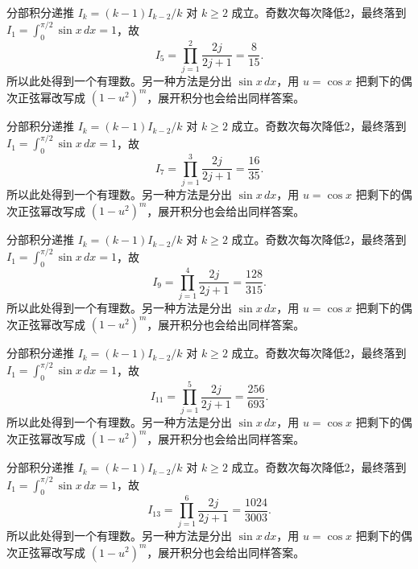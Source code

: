 \documentclass[12pt,fontset=fandol]{ctexart}
\begin{document}
\begin{solve}\label{ans:c16q8}
分部积分递推 $I_k=(k-1)I_{k-2}/k$ 对 $k\ge2$ 成立。奇数次每次降低2，最终落到 $I_1=\int_0^{\pi/2}\sin x\,dx=1$，故
\[
I_{5}=\prod_{j=1}^{2}\frac{2j}{2j+1}=\frac{8}{15}.
\]
所以此处得到一个有理数。另一种方法是分出 $\sin x\,dx$，用 $u=\cos x$ 把剩下的偶次正弦幂改写成 $(1-u^2)^m$，展开积分也会给出同样答案。
\end{solve}

\begin{solve}\label{ans:c16q9}
分部积分递推 $I_k=(k-1)I_{k-2}/k$ 对 $k\ge2$ 成立。奇数次每次降低2，最终落到 $I_1=\int_0^{\pi/2}\sin x\,dx=1$，故
\[
I_{7}=\prod_{j=1}^{3}\frac{2j}{2j+1}=\frac{16}{35}.
\]
所以此处得到一个有理数。另一种方法是分出 $\sin x\,dx$，用 $u=\cos x$ 把剩下的偶次正弦幂改写成 $(1-u^2)^m$，展开积分也会给出同样答案。
\end{solve}

\begin{solve}\label{ans:c16q10}
分部积分递推 $I_k=(k-1)I_{k-2}/k$ 对 $k\ge2$ 成立。奇数次每次降低2，最终落到 $I_1=\int_0^{\pi/2}\sin x\,dx=1$，故
\[
I_{9}=\prod_{j=1}^{4}\frac{2j}{2j+1}=\frac{128}{315}.
\]
所以此处得到一个有理数。另一种方法是分出 $\sin x\,dx$，用 $u=\cos x$ 把剩下的偶次正弦幂改写成 $(1-u^2)^m$，展开积分也会给出同样答案。
\end{solve}

\begin{solve}\label{ans:c16q11}
分部积分递推 $I_k=(k-1)I_{k-2}/k$ 对 $k\ge2$ 成立。奇数次每次降低2，最终落到 $I_1=\int_0^{\pi/2}\sin x\,dx=1$，故
\[
I_{11}=\prod_{j=1}^{5}\frac{2j}{2j+1}=\frac{256}{693}.
\]
所以此处得到一个有理数。另一种方法是分出 $\sin x\,dx$，用 $u=\cos x$ 把剩下的偶次正弦幂改写成 $(1-u^2)^m$，展开积分也会给出同样答案。
\end{solve}

\begin{solve}\label{ans:c16q12}
分部积分递推 $I_k=(k-1)I_{k-2}/k$ 对 $k\ge2$ 成立。奇数次每次降低2，最终落到 $I_1=\int_0^{\pi/2}\sin x\,dx=1$，故
\[
I_{13}=\prod_{j=1}^{6}\frac{2j}{2j+1}=\frac{1024}{3003}.
\]
所以此处得到一个有理数。另一种方法是分出 $\sin x\,dx$，用 $u=\cos x$ 把剩下的偶次正弦幂改写成 $(1-u^2)^m$，展开积分也会给出同样答案。
\end{solve}
\end{document}
